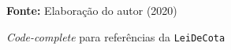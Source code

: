 \begin{figure}[ht!]
\centering

\caption{\textmd{\textit{Code-complete}} para referências da \texttt{LeiDeCota}}
\label{fig:codecomplete}

\par\medskip\textbf{Fonte:} Elaboração do autor (2020) \par\medskip

\end{figure}

